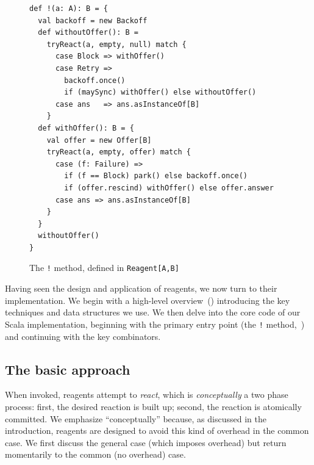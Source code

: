 \documentclass[preprint,nocopyrightspace]{sigplanconf}
\begin{document}
\begin{figure}
\begin{lstlisting}[frame=single]
def !(a: A): B = {
  val backoff = new Backoff
  def withoutOffer(): B =
    tryReact(a, empty, null) match {
      case Block => withOffer()
      case Retry => 
        backoff.once()
        if (maySync) withOffer() else withoutOffer()
      case ans   => ans.asInstanceOf[B]
    }
  def withOffer(): B = {
    val offer = new Offer[B]
    tryReact(a, empty, offer) match {
      case (f: Failure) => 
        if (f == Block) park() else backoff.once()
        if (offer.rescind) withOffer() else offer.answer
      case ans => ans.asInstanceOf[B]
    }
  }
  withoutOffer()
}
\end{lstlisting}
\nocaptionrule
\caption{The \lstinline{!} method, defined in \lstinline{Reagent[A,B]}}
\label{fig:reaction}
\end{figure}



Having seen the design and application of reagents, we now turn to their
implementation.  We begin with a high-level overview~()
introducing the key techniques and data structures we use.  We then delve into
the core code of our Scala implementation, beginning with the primary entry
point (the \lstinline{!} method,~) and continuing with the
key combinators.

\subsection{The basic approach}
\label{sec:impl-approach}

When invoked, reagents attempt to \emph{react}, which is \emph{conceptually} a
two phase process: first, the desired reaction is built up; second, the reaction
is atomically committed.  We emphasize ``conceptually'' because, as discussed in
the introduction, reagents are designed to avoid this kind of overhead in the
common case.  We first discuss the general case (which imposes overhead) but
return momentarily to the common (no overhead) case.
\end{document}
